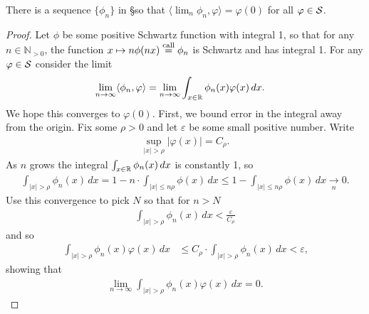     \begin{thm}
      There is a sequence $\{\phi_n\}$ in \S so that $\langle\lim_n \phi_n,\varphi\rangle = \varphi(0)$ for all $\varphi\in\S$.
    \end{thm}
    \begin{proof}
      Let $\phi$ be some positive Schwartz function with integral 1, so that for any $n\in\mathbb{N}_{>0}$, the function $x\mapsto n\phi(nx) \call \phi_n$ is Schwartz and has integral 1.
      For any $\varphi\in\S$ consider the limit
      \begin{align*}
        \lim_{n\rightarrow\infty}\langle\phi_n,\varphi\rangle 
        &=\lim_{n\rightarrow\infty}\int_{x\in\R} \phi_n(x)\varphi(x)\,dx\text{.}
      \end{align*}
      We hope this converges to $\varphi(0)$.
      First, we bound error in the integral away from the origin.
      Fix some $\rho>0$ and let $\varepsilon$ be some small positive number.
      Write
      \begin{align*}
        \sup_{|x|>\rho} |\varphi(x)| = C_\rho \text{.}
      \end{align*}
      As $n$ grows the integral $\int_{x\in\R}\phi_n(x)\,dx$ is constantly 1, so
      \begin{align*}
        \int_{|x|>\rho} \phi_n(x)\,dx
        = 1-n\cdot\int_{|x|\le n\rho} \phi(x)\,dx
        \le 1-\int_{|x|\le n\rho} \phi(x)\,dx
        \underset n\longrightarrow 0 \text{.}
      \end{align*}
      Use this convergence to pick $N$ so that for $n>N$
      \begin{align*}
        \int_{|x|>\rho} \phi_n(x)\,dx
        < \frac\varepsilon{C_\rho}
      \end{align*}
      and so
      \begin{align*}
        \int_{|x|>\rho} \phi_n(x)\varphi(x)\,dx
        &\le C_\rho \cdot \int_{|x|>\rho} \phi_n(x)\,dx
        < \varepsilon \text{,}
      \end{align*}
      showing that
      \begin{align*}
        \lim_{n\rightarrow\infty} \int_{|x|>\rho} \phi_n(x)\varphi(x)\,dx
        = 0 \text{.}
      \end{align*}


\end{proof}
